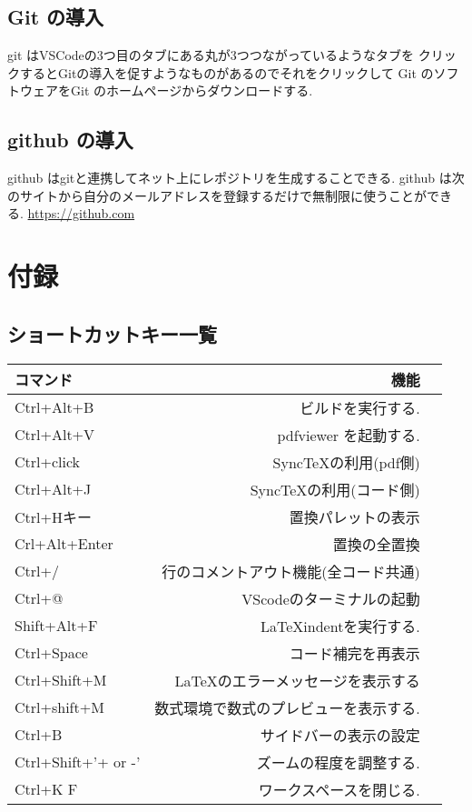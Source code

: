 \documentclass{ltjsarticle}
\begin{document}
\subsection{Git の導入}
git はVSCodeの3つ目のタブにある丸が3つつながっているようなタブを
クリックするとGitの導入を促すようなものがあるのでそれをクリックして
Git のソフトウェアをGit のホームページからダウンロードする.
\subsection{github の導入}
github はgitと連携してネット上にレポジトリを生成することできる.
github は次のサイトから自分のメールアドレスを登録するだけで無制限に使うことができる.
\url{https://github.com}

\section{付録}
\subsection*{ショートカットキー一覧}
\begin{center}
  \begin{tabular}{lrr} \hline
    コマンド            & 機能                  \\ \hline
    Ctrl+Alt+B          & ビルドを実行する.           \\
    Ctrl+Alt+V          & pdfviewer を起動する.    \\
    Ctrl+click          & SyncTeXの利用(pdf側)    \\
    Ctrl+Alt+J          & SyncTeXの利用(コード側)    \\
    Ctrl+Hキー          & 置換パレットの表示           \\
    Crl+Alt+Enter       & 置換の全置換              \\
    Ctrl+/              & 行のコメントアウト機能(全コード共通) \\
    Ctrl+@              & VScodeのターミナルの起動     \\
    Shift+Alt+F         & LaTeXindentを実行する.\\
    Ctrl+Space          & コード補完を再表示\\
    Ctrl+Shift+M        & \LaTeX のエラーメッセージを表示する\\
    Ctrl+shift+M        & 数式環境で数式のプレビューを表示する.\\ 
    Ctrl+B              & サイドバーの表示の設定\\
    Ctrl+Shift+'+ or -' & ズームの程度を調整する.        \\
    Ctrl+K F            & ワークスペースを閉じる.\\ \hline
  \end{tabular}
\end{center}
\end{document}
